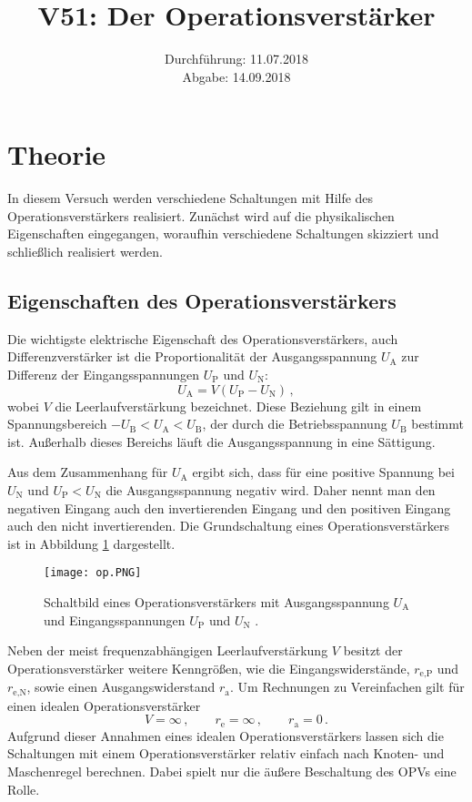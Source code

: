 \documentclass[
  bibliography=totoc,     %
  captions=tableheading,  %
  titlepage=firstiscover, %
]{scrartcl}
\title{V51: Der Operationsverstärker}
\author{
  Simon Schulte
  \texorpdfstring{
    \\
    \href{mailto:simon.schulte@udo.edu}{simon.schulte@udo.edu}
  }{}
  \texorpdfstring{\and}{, }
  Tim Sedlaczek
  \texorpdfstring{
    \\
    \href{mailto:tim.sedlaczek@udo.edu}{tim.sedlaczek@udo.edu}
  }{}
}
\date{Durchführung: 11.07.2018\\
      Abgabe: 14.09.2018}
\begin{document}
\maketitle
\thispagestyle{empty}
\setcounter{page}{1}
\section{Theorie}
\label{sec:theorie}
In diesem Versuch werden verschiedene
Schaltungen mit Hilfe des Operationsverstärkers realisiert.
Zunächst wird auf die physikalischen Eigenschaften eingegangen,
woraufhin verschiedene Schaltungen skizziert und schließlich
realisiert werden.

\subsection{Eigenschaften des Operationsverstärkers}
\label{subsec:eigenschaften}
Die wichtigste elektrische Eigenschaft des Operationsverstärkers, auch
Differenzverstärker ist die Proportionalität der Ausgangsspannung $U_\text{A}$ zur
Differenz der Eingangsspannungen $U_\text{P}$ und $U_\text{N}$:
\begin{equation}
\label{eq:proportionalität}
    U_\text{A} = V(U_\text{P} - U_\text{N})\,,
\end{equation}
wobei $V$ die Leerlaufverstärkung bezeichnet.
Diese Beziehung gilt in einem Spannungsbereich
$-U_\text{B} < U_\text{A} < U_\text{B}$, der durch die Betriebsspannung
$U_\text{B}$ bestimmt ist. Außerhalb dieses Bereichs läuft die
Ausgangsspannung in eine Sättigung.

\noindent
Aus dem Zusammenhang für $U_\text{A}$ ergibt sich, dass für eine positive Spannung
bei $U_\text{N}$ und $U_\text{P} \less U_\text{N}$ die Ausgangsspannung negativ wird.
Daher nennt man den negativen Eingang auch den invertierenden Eingang und den positiven
Eingang auch den nicht invertierenden.
Die Grundschaltung eines Operationsverstärkers ist in Abbildung \ref{fig:op} dargestellt.
\begin{figure}
    \centering
    \texttt{[image: op.PNG]}
    \caption{
        Schaltbild eines Operationsverstärkers mit Ausgangsspannung
        $U_\text{A}$ und Eingangsspannungen $U_\text{P}$ und
        $U_\text{N}$ \cite{V51}.
    }
    \label{fig:op}
\end{figure}

\noindent
Neben der meist frequenzabhängigen Leerlaufverstärkung $V$ besitzt der
Operationsverstärker weitere Kenngrößen, wie die Eingangswiderstände,
$r_\text{e,P}$ und $r_\text{e,N}$, sowie
einen Ausgangswiderstand $r_\text{a}$.
Um Rechnungen zu Vereinfachen gilt für einen idealen Operationsverstärker
\begin{equation}
\label{eq:id-verstärker}
    V = \infty\,,\qquad r_\text{e} = \infty\,,\qquad r_\text{a} = 0\,.
\end{equation}
Aufgrund dieser Annahmen eines idealen Operationsverstärkers lassen sich die
Schaltungen mit einem Operationsverstärker relativ einfach nach Knoten- und Maschenregel
berechnen. Dabei spielt nur die äußere Beschaltung des OPVs eine Rolle.\\
\end{document}
